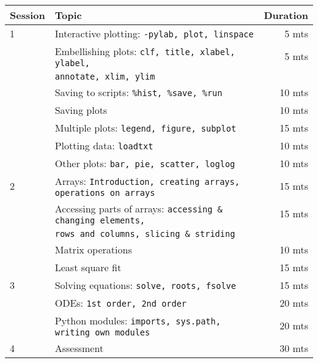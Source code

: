 \documentclass{article}
\begin{document}
\begin{tabular}{llr}
\hline
Session & Topic & Duration\\\hline
1 & Interactive plotting: \tt{-pylab, plot, linspace}                     & ~5 mts\\
  & Embellishing plots: \tt{clf, title, xlabel, ylabel,}                  & ~5 mts\\
  & \tt{annotate, xlim, ylim}                                             &\\
  & Saving to scripts: \tt{\%hist, \%save, \%run}                         & 10 mts\\
  & Saving plots                                                          & 10 mts\\
  & Multiple plots: \tt{legend, figure, subplot}                          & 15 mts\\
  & Plotting data: \tt{loadtxt}                                           & 10 mts\\
  & Other plots: \tt{bar, pie, scatter, loglog}                           & 10 mts\\\hline

2 & Arrays: \tt{Introduction, creating arrays, operations on arrays}      & 15 mts\\
  & Accessing parts of arrays: \tt{accessing \& changing elements,}       & 15 mts\\
  & \tt{rows and columns, slicing \& striding}                            &\\
  & Matrix operations                                                     & 10 mts\\
  & Least square fit                                                      & 15 mts\\\hline

3 & Solving equations: \tt{solve, roots, fsolve}                          & 15 mts\\
  & ODEs: \tt{1st order, 2nd order}                                       & 20 mts\\
  & Python modules: \tt{imports, sys.path, writing own modules}           & 20 mts\\\hline

4 & Assessment                                                            & 30 mts\\\hline\hline
\end{tabular}  
\end{document}
